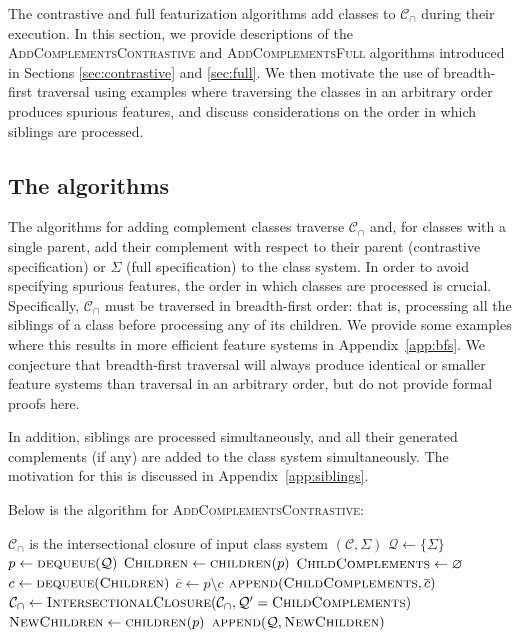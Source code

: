 \documentclass[11pt, oneside]{article}   	%
\begin{document}
The contrastive and full featurization algorithms add classes to $\mathcal{C_\cap}$ during their execution. In this section, we provide descriptions of the \textsc{AddComplementsContrastive} and \textsc{AddComplementsFull} algorithms introduced in Sections \ref{sec:contrastive} and \ref{sec:full}. We then motivate the use of breadth-first traversal using examples where traversing the classes in an arbitrary order produces spurious features, and discuss considerations on the order in which siblings are processed.

\subsection{The algorithms}

The algorithms for adding complement classes traverse $\mathcal{C_\cap}$ and, for classes with a single parent, add their complement with respect to their parent (contrastive specification) or $\Sigma$ (full specification) to the class system. In order to avoid specifying spurious features, the order in which classes are processed is crucial. Specifically, $\mathcal{C_\cap}$ must be traversed in breadth-first order: that is, processing all the siblings of a class before processing any of its children. We provide some examples where this results in more efficient feature systems in Appendix~\ref{app:bfs}. We conjecture that breadth-first traversal will always produce identical or smaller feature systems than traversal in an arbitrary order, but do not provide formal proofs here. 

In addition, siblings are processed simultaneously, and all their generated complements (if any) are added to the class system simultaneously. The motivation for this is discussed in Appendix~\ref{app:siblings}.

Below is the algorithm for \textsc{AddComplementsContrastive}:

\noindent \begin{algorithmic}
	\REQUIRE $\mathcal C_\cap$ is the intersectional closure of input class system $(\mathcal C, \Sigma)$
	\STATE
	\STATE $\mathcal Q \leftarrow \{\Sigma\}$
	\STATE
	\STATE $p \leftarrow \textsc{dequeue}(\mathcal Q)$
	\STATE $\textsc{Children} \leftarrow \textsc{children}(p)$
	\STATE $\textsc{ChildComplements} \leftarrow \varnothing$
	\STATE $c \leftarrow \textsc{dequeue}(\textsc{Children})$
	\STATE $\overline{c} \leftarrow p \setminus c$
	\STATE $\textsc{append}(\textsc{ChildComplements},\overline{c})$
	\ENDIF
	\ENDWHILE
	\STATE $\mathcal C_\cap \leftarrow \textsc{IntersectionalClosure}(\mathcal C_\cap, \mathcal Q' = \textsc{ChildComplements})$
	\STATE $\textsc{NewChildren} \leftarrow \textsc{children}(p)$
	\STATE $\textsc{append}(\mathcal Q, \textsc{NewChildren})$
	\ENDWHILE
\end{algorithmic}
\end{document}
